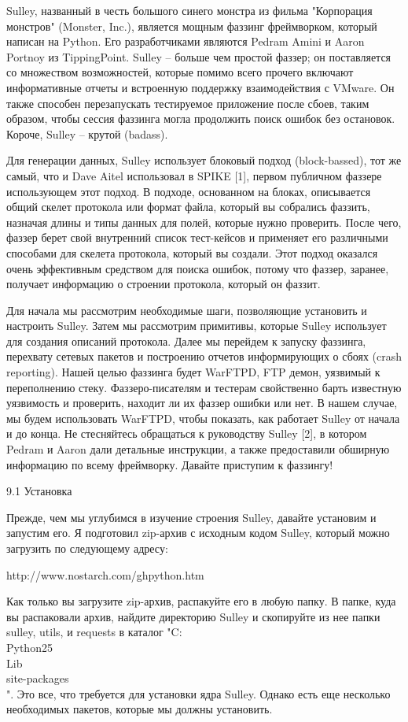 \documentclass[12pt]{book}
\begin{document}
Sulley, названный в честь большого синего монстра из фильма "Корпорация монстров" (Monster, Inc.), является мощным фаззинг фреймворком, который написан на Python. Его разработчиками являются Pedram Amini и Aaron Portnoy из TippingPoint. Sulley – больше чем простой фаззер; он поставляется со множеством возможностей, которые помимо всего прочего включают информативные отчеты и встроенную поддержку взаимодействия с VMware. Он также способен перезапускать тестируемое приложение после сбоев, таким образом, чтобы сессия фаззинга могла продолжить поиск ошибок без остановок. Короче, Sulley – крутой (badass).

Для генерации данных, Sulley использует блоковый подход (block-bassed), тот же самый, что и Dave Aitel использовал в SPIKE [1], первом публичном фаззере использующем этот подход. В подходе, основанном на блоках, описывается общий скелет протокола или формат файла, который вы собрались фаззить, назначая длины и типы данных для полей, которые нужно проверить. После чего, фаззер берет свой внутренний список тест-кейсов и применяет его различными способами для скелета протокола, который вы создали. Этот подход оказался очень эффективным средством для поиска ошибок, потому что фаззер, заранее, получает информацию о строении протокола, который он фаззит.

Для начала мы рассмотрим необходимые шаги, позволяющие установить и настроить Sulley. Затем мы рассмотрим примитивы, которые Sulley использует для создания описаний протокола. Далее мы перейдем к запуску фаззинга, перехвату сетевых пакетов и построению отчетов информирующих о сбоях (crash reporting). Нашей целью фаззинга будет WarFTPD, FTP демон, уязвимый к переполнению стеку. Фаззеро-писателям и тестерам свойственно барть известную уязвимость и проверить, находит ли их фаззер ошибки или нет. В нашем случае, мы будем использовать WarFTPD, чтобы показать, как работает Sulley от начала и до конца. Не стесняйтесь обращаться к руководству Sulley [2], в котором Pedram и Aaron дали детальные инструкции, а также предоставили обширную информацию по всему фреймворку. Давайте приступим к фаззингу! 


9.1 Установка

Прежде, чем мы углубимся в изучение строения Sulley, давайте установим и запустим его. Я подготовил zip-архив с исходным кодом Sulley, который можно загрузить по следующему адресу:

http://www.nostarch.com/ghpython.htm

Как только вы загрузите zip-архив, распакуйте его в любую папку. В папке, куда вы распаковали архив, найдите директорию Sulley и скопируйте из нее папки sulley, utils, и requests в каталог "C:\\Python25\\Lib\\site-packages\\". Это все, что требуется для установки ядра Sulley. Однако есть еще несколько необходимых пакетов, которые мы должны установить.
\end{document}
